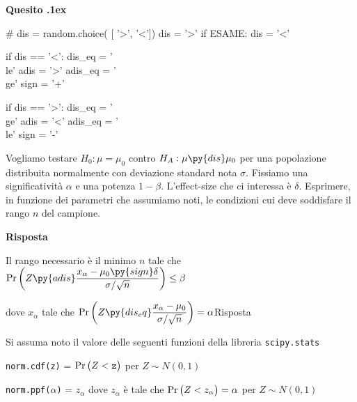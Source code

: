 \documentclass[11pt,twoside,a4paper]{article}
\def\Pr{{\rm Pr\,}}
\newcounter{quesito}
\newenvironment{question}{\bigskip\addtocounter{quesito}{1}\par\textbf{Quesito \thequesito.\kern1ex}}{\vspace{\parskip}}
\newenvironment{answer}{\par\textbf{Risposta\quad}}{\vspace{\parskip}}
\begin{document}
\clearpage
\begin{question} 
\begin{pycode}
# dis = random.choice( [ '>', '<'])
dis =  '>'
if ESAME: dis = '<'

if dis == '<':
   dis_eq  = '\\le'
   adis    = '>'
   adis_eq = '\\ge'
   sign = '+'

if dis == '>':
   dis_eq  = '\\ge'
   adis    = '<'
   adis_eq = '\\le'
   sign = '-'

\end{pycode}
Vogliamo testare $H_0:\mu=\mu_0$ contro $H_A:\mu\py{dis}\mu_0$ per una popolazione distribuita normalmente con deviazione standard nota $\sigma$. Fissiamo una significatività $\alpha$ e una potenza $1-\beta$. L'effect-size che ci interessa è $\delta$.  Esprimere, in funzione dei parametri che assumiamo noti, le condizioni cui deve soddisfare il rango $n$ del campione.

\begin{answer}

{\color{blue}Il rango necessario è il minimo $n$ tale che $\displaystyle\Pr\bigg(Z\py{adis}\frac{x_\alpha-\mu_0\py{sign}\delta}{\sigma/\sqrt{n}}\bigg)\le\beta$

dove $x_\alpha$ tale che $\displaystyle\Pr\bigg(Z\py{dis_eq} \frac{x_\alpha-\mu_0}{\sigma/\sqrt{n}}\bigg)=\alpha$\hfill Risposta}


\end{answer}

\end{question}















\vfill
\hrulefill

Si assuma noto il valore delle seguenti funzioni della libreria {\tt scipy.stats\/}

{\tt norm.cdf(z)} = $\Pr\big(Z<{\tt z}\big)$ per $Z\sim N(0,1)$ 

{\tt norm.ppf($\alpha$)} = $z_\alpha$ dove $z_\alpha$ è tale che $\Pr\big(Z<z_\alpha\big)=\alpha$ per $Z\sim N(0,1)$ 
\end{document}
